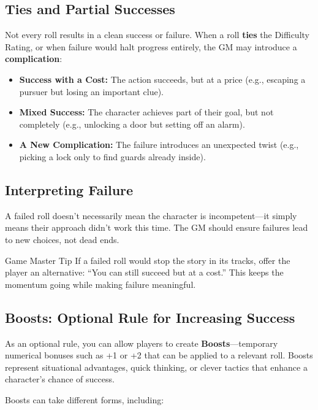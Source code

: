 \subsection{Ties and Partial Successes}
Not every roll results in a clean success or failure. When a roll \textbf{ties} the Difficulty Rating, or when failure would halt progress entirely, the GM may introduce a \textbf{complication}:

\begin{itemize}
    \item \textbf{Success with a Cost:} The action succeeds, but at a price (e.g., escaping a pursuer but losing an important clue).
    \item \textbf{Mixed Success:} The character achieves part of their goal, but not completely (e.g., unlocking a door but setting off an alarm).
    \item \textbf{A New Complication:} The failure introduces an unexpected twist (e.g., picking a lock only to find guards already inside).
\end{itemize}

\subsection{Interpreting Failure}
A failed roll doesn’t necessarily mean the character is incompetent—it simply means their approach didn’t work this time. The GM should ensure failures lead to new choices, not dead ends.

\begin{DndComment}{Game Master Tip}
    If a failed roll would stop the story in its tracks, offer the player an alternative: “You can still succeed but at a cost.” This keeps the momentum going while making failure meaningful.
\end{DndComment}

\subsection{Boosts: Optional Rule for Increasing Success}

As an optional rule, you can allow players to create \textbf{Boosts}—temporary numerical bonuses such as +1 or +2 that can be applied to a relevant roll. Boosts represent situational advantages, quick thinking, or clever tactics that enhance a character’s chance of success.  

Boosts can take different forms, including:  

